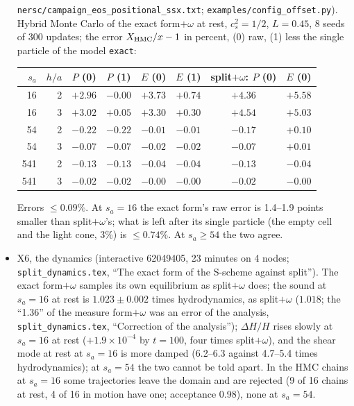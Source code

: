 \documentclass[11pt,aps,preprint,nofootinbib,superscriptaddress,tightenlines]{revtex4-2}
\begin{document}
\begin{itemize}
  \nolinkurl{nersc/campaign_eos_positional_ssx.txt}; \nolinkurl{examples/config_offset.py}).  Hybrid Monte Carlo of the exact form$+\omega$ at rest, $c_s^2=1/2$,
  $L=0.45$, 8 seeds of 300 updates; the error $X_{\rm HMC}/x-1$ in percent, (0) raw, (1) less the single particle of the model \texttt{exact}:
  \begin{center}
  \begin{tabular}{rrcccccc}
  \toprule
  $s_a$ & $h/a$ & $P$ (0) & $P$ (1) & $E$ (0) & $E$ (1) & split$+\omega$: $P$ (0) & $E$ (0) \\
  \midrule
  16 & 2 & $+2.96$ & $-0.00$ & $+3.73$ & $+0.74$ & $+4.36$ & $+5.58$ \\
  16 & 3 & $+3.02$ & $+0.05$ & $+3.30$ & $+0.30$ & $+4.54$ & $+5.03$ \\
  54 & 2 & $-0.22$ & $-0.22$ & $-0.01$ & $-0.01$ & $-0.17$ & $+0.10$ \\
  54 & 3 & $-0.07$ & $-0.07$ & $-0.02$ & $-0.02$ & $-0.07$ & $+0.01$ \\
  541 & 2 & $-0.13$ & $-0.13$ & $-0.04$ & $-0.04$ & $-0.13$ & $-0.04$ \\
  541 & 3 & $-0.02$ & $-0.02$ & $-0.00$ & $-0.00$ & $-0.02$ & $-0.00$ \\
  \bottomrule
  \end{tabular}
  \end{center}
  Errors $\le0.09\%$.  At $s_a=16$ the exact form's raw error is 1.4--1.9 points smaller than split$+\omega$'s; what is left after its single particle
  (the empty cell and the light cone, 3\%) is $\le0.74\%$.  At $s_a\ge54$ the two agree.
\item X6, the dynamics (interactive 62049405, 23 minutes on 4 nodes; \nolinkurl{split_dynamics.tex}, ``The exact form of the S-scheme against split'').  The
  exact form$+\omega$ samples its own equilibrium as split$+\omega$ does; the sound at $s_a=16$ at rest is $1.023\pm0.002$ times hydrodynamics, as split$+\omega$
  ($1.018$; the ``1.36'' of the measure form$+\omega$ was an error of the analysis, \nolinkurl{split_dynamics.tex}, ``Correction of the analysis''); $\Delta H/H$ rises slowly at $s_a=16$ at rest ($+1.9\times10^{-4}$ by $t=100$, four times split$+\omega$), and the shear mode at rest at
  $s_a=16$ is more damped (6.2--6.3 against 4.7--5.4 times hydrodynamics); at $s_a=54$ the two cannot be told apart.  In the HMC chains at $s_a=16$ some trajectories
  leave the domain and are rejected (9 of 16 chains at rest, 4 of 16 in motion have one; acceptance 0.98), none at $s_a=54$.
\end{itemize}
\end{document}
